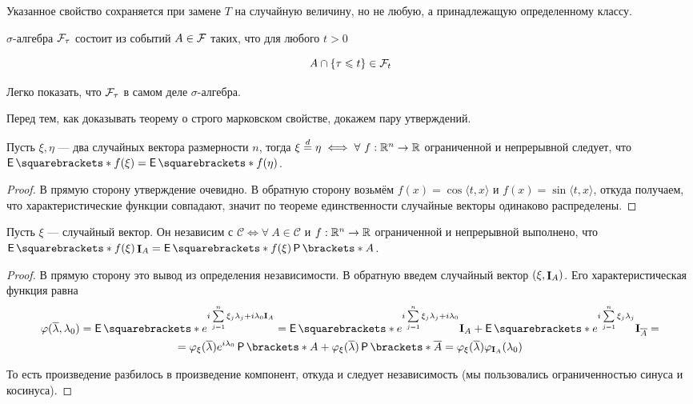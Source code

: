 Указанное свойство сохраняется при замене $T$ на случайную величину, но не любую,
а принадлежащую определенному классу.

\begin{definition}
  $\sigma$-алгебра $\mathcal{F}_\tau$ состоит из событий $A \in \mathcal{F}$ таких, что для любого
  $t > 0$

  \[
    A \cap \{\tau \leqslant t\} \in \mathcal{F}_t
  \]
\end{definition}

Легко показать, что $\mathcal{F}_\tau$ в самом деле $\sigma$-алгебра.

Перед тем, как доказывать теорему о строго марковском свойстве, докажем пару утверждений.

\begin{lemma}
  Пусть $\xi, \eta$ --- два случайных вектора размерности $n$, тогда
  $\xi \overset{d}{=} \eta \iff \forall \ f: \mathbb{R}^n \to \mathbb{R}$ ограниченной и непрерывной
  следует, что $\E{f(\xi)} = \E{f(\eta)}$.
\end{lemma}

\begin{proof}
  В прямую сторону утверждение очевидно.
  В обратную сторону возьмём $f(x) = \cos\langle t, x \rangle$ и 
  $f(x) = \sin\langle t, x \rangle$, откуда получаем, что характеристические
  функции совпадают, значит по теореме единственности случайные векторы одинаково
  распределены.
\end{proof}

\begin{lemma}
  Пусть $\xi$ --- случайный вектор. Он независим с $\mathscr{C} \iff \forall
  \ A \in \mathscr{C}$ и $f: \mathbb{R}^n \to \mathbb{R}$ ограниченной и непрерывной выполнено,
  что $\E{f(\xi)\I_A} = \E{f(\xi)}\Pr{A}$.
\end{lemma}

\begin{proof}
  В прямую сторону это вывод из определения независимости.
  В обратную введем случайный вектор $(\xi, \mathop{\mathbf{I}}_A)$. Его характеристическая функция
  равна 
  \begin{multline}
    \phi(\overline{\lambda}, \lambda_0) = \E{e^{i\sum\limits_{j = 1}^n \xi_j
    \lambda_j + i\lambda_0 \mathbf{I}_A}} =
    \E{e^{i\sum\limits_{j = 1}^n \xi_j
    \lambda_j + i\lambda_0}  \mathbf{I}_A} + \E{e^{i\sum\limits_{j = 1}^n \xi_j
    \lambda_j} \mathbf{I}_{\overline{A}}} =\\=
    \phi_\xi(\overline{\lambda})e^{i\lambda_0}\Pr{A} + \phi_\xi(\overline{\lambda})
    \Pr{\overline{A}} = \phi_{\xi}(\overline{\lambda})\phi_{\mathbf{I}_A}(\lambda_0)
  \end{multline}

  То есть произведение разбилось в произведение компонент, откуда и следует
  независимость (мы пользовались ограниченностью синуса и косинуса).
\end{proof}

